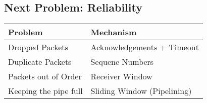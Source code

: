 \subsection{Next Problem: Reliability}
\begin{table}[H]
    \begin{tabular}{ll}
        Problem               & Mechanism                   \\\toprule
        Dropped Packets       & Acknowledgements + Timeout  \\
        Duplicate Packets     & Sequene Numbers             \\
        Packets out of Order  & Receiver Window             \\
        Keeping the pipe full & Sliding Window (Pipelining)
    \end{tabular}
\end{table}


